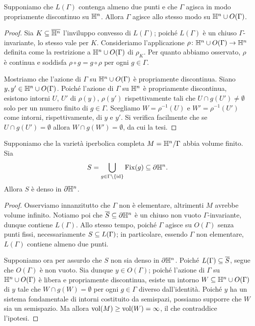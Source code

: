 \begin{proposition*}
Supponiamo che $L(\Gamma)$ contenga almeno due punti e che $\Gamma$ agisca in modo propriamente discontinuo su $\mathbb{H}^n$. Allora $\Gamma$ agisce allo stesso modo su $\mathbb{H}^n\cup O(\Gamma)$.
\end{proposition*}
\begin{proof}
Sia $K\subseteq\overline{\mathbb{H}^n}$ l'inviluppo convesso di $L(\Gamma)$; poiché $L(\Gamma)$ è un chiuso $\Gamma$-invariante, lo stesso vale per $K$. Consideriamo l'applicazione $\rho\colon\mathbb{H}^n\cup O(\Gamma)\to\mathbb{H}^n$ definita come la restrizione a $\mathbb{H}^n\cup O(\Gamma)$ di $\rho_K$. Per quanto abbiamo osservato, $\rho$ è continua e soddisfa $\rho\circ g=g\circ\rho$ per ogni $g\in\Gamma$.

Mostriamo che l'azione di $\Gamma$ su $\mathbb{H}^n\cup O(\Gamma)$ è propriamente discontinua. Siano $y,y'\in\mathbb{H}^n\cup O(\Gamma)$. Poiché l'azione di $\Gamma$ su $\mathbb{H}^n$ è propriamente discontinua, esistono intorni $U$, $U'$ di $\rho(y)$, $\rho(y')$ rispettivamente tali che $U\cap g(U')\neq\emptyset$ solo per un numero finito di $g\in\Gamma$. Scegliamo $W=\rho^{-1}(U)$ e $W'=\rho^{-1}(U')$ come intorni, rispettivamente, di $y$ e $y'$. Si verifica facilmente che se $U\cap g(U')=\emptyset$ allora $W\cap g(W')=\emptyset$, da cui la tesi.
\end{proof}

\begin{theorem*}
Supponiamo che la varietà iperbolica completa $M=\mathbb{H}^n/\Gamma$ abbia volume finito. Sia
\[
S=\bigcup_{g\in\Gamma\setminus\{\operatorname{id}\}}\operatorname{Fix}(g)\subseteq\partial\mathbb{H}^n.
\]
Allora $S$ è denso in $\partial\mathbb{H}^n$.
\end{theorem*}
\begin{proof}
Osserviamo innanzitutto che $\Gamma$ non è elementare, altrimenti $M$ avrebbe volume infinito. Notiamo poi che $\overline{S}\subseteq\partial\mathbb{H}^n$ è un chiuso non vuoto $\Gamma$-invariante, dunque contiene $L(\Gamma)$. Allo stesso tempo, poiché $\Gamma$ agisce su $O(\Gamma)$ senza punti fissi, necessariamente $S\subseteq L(\Gamma)$; in particolare, essendo $\Gamma$ non elementare, $L(\Gamma)$ contiene almeno due punti.

Supponiamo ora per assurdo che $S$ non sia denso in $\partial\mathbb{H}^n$. Poiché $L(\Gamma)\subseteq\overline{S}$, segue che $O(\Gamma)$ è non vuoto. Sia dunque $y\in O(\Gamma)$; poiché l'azione di $\Gamma$ su $\mathbb{H}^n\cup O(\Gamma)$ è libera e propriamente discontinua, esiste un intorno $W\subseteq\mathbb{H}^n\cup O(\Gamma)$ di $y$ tale che $W\cap g(W)=\emptyset$ per ogni $g\in\Gamma$ diverso dall'identità. Poiché $y$ ha un sistema fondamentale di intorni costituito da semispazi, possiamo supporre che $W$ sia un semispazio. Ma allora $\operatorname{vol}(M)\ge\operatorname{vol}(W)=\infty$, il che contraddice l'ipotesi.
\end{proof}

